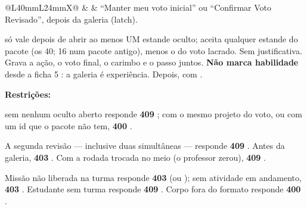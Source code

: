 \begin{tabularx}{\linewidth}{@{}L{40mm}L{24mm}X@{}}
\zebra {} &  & \enquote{Manter meu voto inicial} ou \enquote{Confirmar Voto Revisado}, depois da galeria (latch).\par {} só vale depois de abrir ao menos UM estande oculto;  aceita qualquer estande do pacote (os 40; 16 num pacote antigo), menos o do voto lacrado. Sem justificativa. Grava a ação, o voto final, o carimbo e o passo  juntos. \textbf{Não marca habilidade} desde a ficha 5 : a galeria é experiência. Depois,  com .\par \textbf{Restrições:}\par \hspace*{1em}\textbullet{}  sem nenhum oculto aberto responde \textbf{409} ;  com o mesmo projeto do voto, ou com um id que o pacote não tem, \textbf{400} .\par \hspace*{1em}\textbullet{} A segunda revisão --- inclusive duas simultâneas --- responde \textbf{409} . Antes da galeria, \textbf{403} . Com a rodada trocada no meio (o professor zerou), \textbf{409} .\par \hspace*{1em}\textbullet{} Missão não liberada na turma responde \textbf{403}  (ou ); sem atividade em andamento, \textbf{403} . Estudante sem turma responde \textbf{409} . Corpo fora do formato responde \textbf{400} .\\

\end{tabularx}
